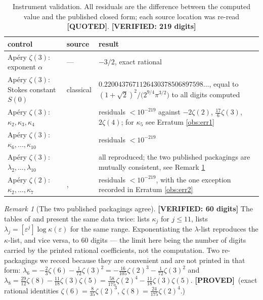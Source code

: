 \documentclass[11pt,reqno]{amsart}
\theoremstyle{plain}
\theoremstyle{definition}
\theoremstyle{remark}
\newtheorem{remark}[theorem]{Remark}
\newcommand{\PROVED}{{\normalfont\sffamily\bfseries[PROVED]}}
\newcommand{\VER}[1]{{\normalfont\sffamily\bfseries[VERIFIED: #1]}}
\newcommand{\QUOTEDMARK}{{\normalfont\sffamily\bfseries[QUOTED]}}
\newcommand{\eps}{\varepsilon}
\begin{document}
\begin{table}[t]
\centering
\caption{Instrument validation. All residuals are the difference between the computed value and
the published closed form; each source location was re-read \QUOTEDMARK. \VER{219 digits}}
\label{tab:validate}
\begin{tabular}{@{}p{}p{}p{}@{}}
\toprule
control & source & result \\
\midrule
Ap\'ery $\zeta(3)$: exponent $\alpha$ & --- &
  $-3/2$, exact rational \\[3pt]
Ap\'ery $\zeta(3)$: Stokes constant $S(0)$ & classical &
  $0.2200437671126430378506897598\ldots$, equal to
  $(1+\sqrt2)^2\bigl/\bigl(2^{9/4}\pi^{3/2}\bigr)$ to all digits computed \\[3pt]
Ap\'ery $\zeta(3)$: $\kappa_2,\kappa_3,\kappa_4$ & \cite[Ex.~29]{BV} &
  residuals $<10^{-219}$ against $-2\zeta(2)$, $\tfrac{17}{6}\zeta(3)$, $2\zeta(4)$; for
  $\kappa_5$ see Erratum \ref{obs:err1} \\[3pt]
Ap\'ery $\zeta(3)$: $\kappa_6,\dots,\kappa_{10}$ & \cite[(47)]{GZ2} &
  residuals $<10^{-219}$ \\[3pt]
Ap\'ery $\zeta(3)$: $\lambda_2,\dots,\lambda_{10}$ & \cite[\S9]{GZ1} &
  all reproduced; the two published packagings are mutually consistent, see Remark
  \ref{rem:packaging} \\[3pt]
Ap\'ery $\zeta(2)$: $\kappa_2,\dots,\kappa_7$ &
  \cite[Ex.~28]{BV}, \cite[Tab.~2 D]{RV} & residuals $<10^{-219}$, with the one
  exception recorded in Erratum \ref{obs:err2} \\
\bottomrule
\end{tabular}
\end{table}

\begin{remark}[The two published packagings agree]\label{rem:packaging} \VER{60 digits}
The tables of \cite{GZ1} and \cite{GZ2} present the same data twice: \cite[(47)]{GZ2} lists
$\kappa_j$ for $j\le11$, \cite[\S9]{GZ1} lists $\lambda_j=[\eps^j]\log\kappa(\eps)$ for the same
range. Exponentiating the $\lambda$-list reproduces the $\kappa$-list, and vice versa, to $60$
digits --- the limit here being the number of digits carried by the printed rational
coefficients, not the computation. Two re-packagings we record because they are convenient and
are not printed in that form: $\lambda_6=-\tfrac{2}{3}\zeta(6)-\tfrac{1}{72}\zeta(3)^2
=-\tfrac{16}{105}\zeta(2)^3-\tfrac{1}{72}\zeta(3)^2$ and
$\lambda_8=\tfrac{29}{12}\zeta(8)-\tfrac{11}{18}\zeta(3)\zeta(5)
=\tfrac{58}{175}\zeta(2)^4-\tfrac{11}{18}\zeta(3)\zeta(5)$. \PROVED\ (exact rational identities
$\zeta(6)=\tfrac{8}{35}\zeta(2)^3$, $\zeta(8)=\tfrac{24}{175}\zeta(2)^4$.)
\end{remark}
\end{document}
